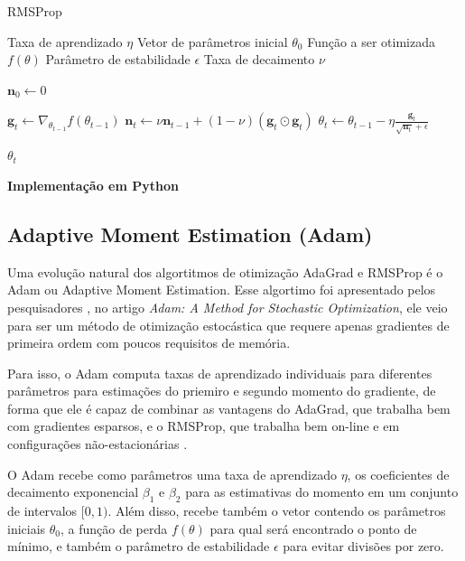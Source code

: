 \begin{algorithm}[H] %
    \caption{RMSProp}
    \label{alg:rmsprop}
    \begin{algorithmic}[1] %

    \Require Taxa de aprendizado $\eta$
    \Require Vetor de parâmetros inicial $\theta_0$
    \Require Função a ser otimizada $f(\theta)$
    \Require Parâmetro de estabilidade $\epsilon$
    \Require Taxa de decaimento $\nu$

    \State $\mathbf{n}_0 \leftarrow 0$ 

        \State $\textbf{g}_t \leftarrow \nabla_{\theta_{t-1}} f(\theta_{t-1})$
        \State $\textbf{n}_t \leftarrow \nu \textbf{n}_{t-1} + (1 - \nu) (\mathbf{g}_t \odot \mathbf{g}_t)$
        \State $\theta_t \leftarrow \theta_{t-1} - \eta \frac{\textbf{g}_t}{\sqrt{\textbf{n}_t} + \epsilon}$
    \EndWhile

    \State \Return $\theta_t$ 
    \end{algorithmic}
\end{algorithm}

\textbf{Implementação em Python}

\subsection{Adaptive Moment Estimation (Adam)}

Uma evolução natural dos algortitmos de otimização AdaGrad e RMSProp é o Adam ou Adaptive Moment Estimation. Esse algortimo foi apresentado pelos pesquisadores \textcite{AdamMethod}, no artigo \textit{Adam: A Method for Stochastic Optimization}, ele veio para ser um método de otimização estocástica que requere apenas gradientes de primeira ordem com poucos requisitos de memória.

Para isso, o Adam computa taxas de aprendizado individuais para diferentes parâmetros para estimações do priemiro e segundo momento do gradiente, de forma que ele é capaz de combinar as vantagens do AdaGrad, que trabalha bem com gradientes esparsos, e o RMSProp, que trabalha bem on-line e em configurações não-estacionárias \parencite{AdamMethod}.

O Adam recebe como parâmetros uma taxa de aprendizado $\eta$, os coeficientes de decaimento exponencial $\beta_1$ e $\beta_2$ para as estimativas do momento em um conjunto de intervalos $[0, 1)$. Além disso, recebe também o vetor contendo os parâmetros iniciais $\theta_0$, a função de perda $f(\theta)$ para qual será encontrado o ponto de mínimo, e também o parâmetro de estabilidade $\epsilon$ para evitar divisões por zero.

